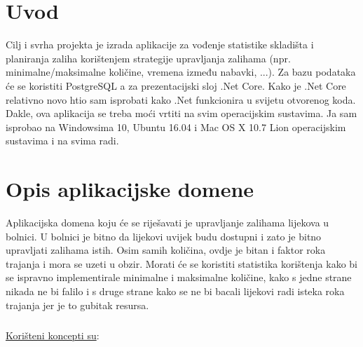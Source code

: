 \documentclass[a4paper,12pt]{foi}
\begin{document}
\maketitle

\tableofcontents

\thispagestyle{empty}

\setcounter{page}{0}

\onehalfspacing

\chapter{Uvod}

Cilj i svrha projekta je izrada aplikacije za vođenje statistike skladišta i planiranja zaliha korištenjem strategije upravljanja zalihama (npr. minimalne/maksimalne količine, vremena između nabavki, ...).
Za bazu podataka će se koristiti PostgreSQL a za prezentacijski sloj .Net Core. Kako je .Net Core relativno novo htio sam isprobati kako .Net funkcionira u svijetu otvorenog koda. Dakle, ova aplikacija se treba moći vrtiti na svim operacijskim sustavima. Ja sam isprobao na Windowsima 10, Ubuntu 16.04 i  Mac OS X 10.7 Lion operacijskim sustavima i na svima radi.

\chapter{Opis aplikacijske domene}

Aplikacijska domena koju će se riješavati je upravljanje zalihama lijekova u bolnici. U bolnici je bitno da lijekovi uvijek  budu dostupni i zato je bitno upravljati zalihama istih. Osim samih količina, ovdje je bitan i faktor roka trajanja i mora se uzeti u obzir. Morati će se koristiti statistika korištenja kako bi se ispravno implementirale minimalne i maksimalne količine, kako s jedne strane nikada ne bi falilo i s druge strane kako se ne bi bacali lijekovi radi isteka roka trajanja jer je to gubitak resursa.
 
\paragraph{}
\underline{Korišteni koncepti su}:
\end{document}
